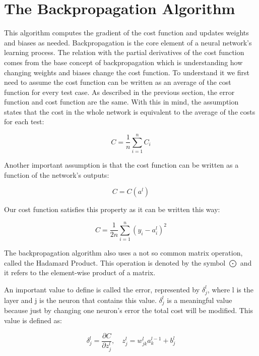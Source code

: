 \documentclass[a4paper, 12pt]{amsart}
\begin{document}
\section{The Backpropagation Algorithm}

This algorithm computes the gradient of the cost function and updates weights
and biases as needed. Backpropagation is the core element of a neural network's
learning process. The relation with the partial derivatives of the cost function
comes from the base concept of backpropagation which is understanding how
changing weights and biases change the cost function. To understand it we first
need to assume the cost function can be written as an average of the cost
function for every test case. As described in the previous section, the error
function and cost function are the same. With this in mind, the assumption
states that the cost in the whole network is equivalent to the average of the
costs for each test:

\begin{equation*}
  C = \frac{1}{n}\sum_{i=1}^{n}C_i
\end{equation*}

Another important assumption is that the cost function can be written as a
function of the network's outputs:

\begin{equation*}
  C = C(a^l)
\end{equation*}

Our cost function satisfies this property as it can be written this way:

\begin{equation*}
  C = \frac{1}{2n}\sum_{i=1}^{n} (y_i-a_i^l)^2
\end{equation*}


The backpropagation algorithm also uses a not so common matrix operation,
called the Hadamard Product. This operation is denoted by the symbol $\bigodot$
and it refers to the element-wise product of a matrix.

An important value to define is called the error, represented by $\delta_j^l$,
where l is the layer and j is the neuron that contains this value. $\delta_j^l$
is a meaningful value because just by changing one neuron's error the total cost
will be modified. This value is defined as:

\begin{equation*}
  \delta_j^l = \frac{\partial C}{\partial z_j^l},\quad
  z^l_j = w_{jk}^la_k^{l-1}+b_j^l
\end{equation*}
\end{document}
